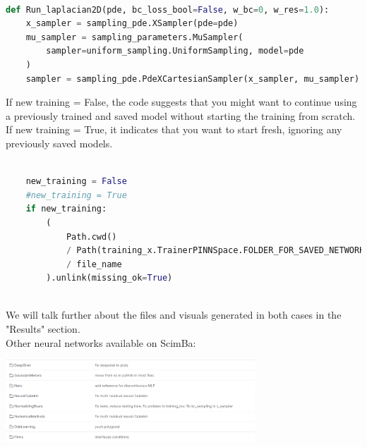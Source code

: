 \documentclass[12pt]{article}
\begin{document}
\begin{lstlisting}[language=Python,caption={},frame=single, backgroundcolor=\color{gray!10}, basicstyle=\footnotesize,rulecolor=\color{blue}, framexleftmargin=3pt, commentstyle=\color{mygreen}, keywordstyle=\color{blue}]

def Run_laplacian2D(pde, bc_loss_bool=False, w_bc=0, w_res=1.0):
    x_sampler = sampling_pde.XSampler(pde=pde)
    mu_sampler = sampling_parameters.MuSampler(
        sampler=uniform_sampling.UniformSampling, model=pde
    )
    sampler = sampling_pde.PdeXCartesianSampler(x_sampler, mu_sampler)

\end{lstlisting}
\newpage
If new training = False, the code suggests that you might want to continue using a previously trained and saved model without starting the training from scratch.
If new training = True, it indicates that you want to start fresh, ignoring any previously saved models.
\begin{lstlisting}[language=Python,caption={},frame=single, backgroundcolor=\color{gray!10}, basicstyle=\footnotesize,rulecolor=\color{blue}, framexleftmargin=3pt, commentstyle=\color{mygreen}, keywordstyle=\color{blue}]

    new_training = False
    #new_training = True
    if new_training:
        (
            Path.cwd()
            / Path(training_x.TrainerPINNSpace.FOLDER_FOR_SAVED_NETWORKS)
            / file_name
        ).unlink(missing_ok=True)
        
\end{lstlisting}

We will talk further about the files and visuals generated in both cases in the "Results" section.
\\
Other neural networks available on ScimBa:
\begin{frame}{}
    \begin{center}
        \includegraphics[width=0.7\textwidth]{images/ScimBa neural networks.png}
    \end{center}
\end{frame}

\newpage
\end{document}
